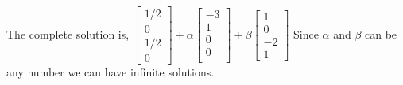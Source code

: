 		\newline
		The complete solution is,
		$\begin{bmatrix} 1/2 \\ 0 \\ 1/2 \\ 0 \end{bmatrix} + \alpha \begin{bmatrix} -3 \\ 1 \\ 0 \\ 0 \\ \end{bmatrix} + \beta \begin{bmatrix} 1 \\ 0 \\ -2 \\ 1 \end{bmatrix}$
		\newline
		Since $\alpha$ and $\beta$ can be any number we can have infinite solutions.